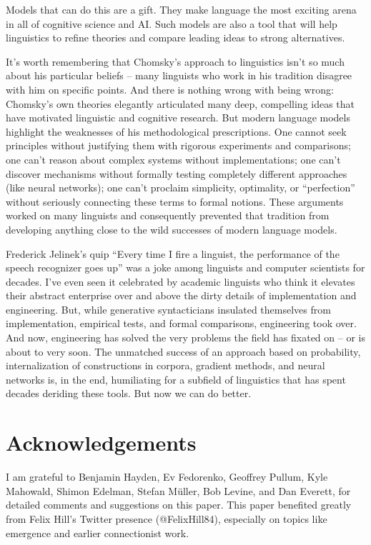 \documentclass[output=paper,colorlinks,citecolor=brown
]{langscibook}
\begin{document}
\noindent Models that can do this are a gift. They make language the most exciting arena in all of cognitive science and AI. Such models are also a tool that will help linguistics to refine theories and compare leading ideas to strong alternatives.

It's worth remembering that Chomsky's approach to linguistics isn't so much about his particular beliefs -- many linguists who work in his tradition disagree with him on specific points. And there is nothing wrong with being wrong: Chomsky's own theories elegantly articulated many deep, compelling ideas that have motivated linguistic and cognitive research. But modern language models highlight the weaknesses of his methodological prescriptions. One cannot seek principles without justifying them with rigorous experiments and comparisons; one can't reason about complex systems without implementations; one can't discover mechanisms without formally testing completely different approaches (like neural networks); one can't proclaim simplicity, optimality, or ``perfection'' without seriously connecting these terms to formal notions. These arguments worked on many linguists and consequently prevented that tradition from developing anything close to the wild successes of modern language models.

Frederick Jelinek's quip ``Every time I fire a linguist, the performance of the speech recognizer goes up'' \citep{jelinek1988applying} was a joke among linguists and computer scientists for decades. I've even seen it celebrated by academic linguists who think it elevates their abstract enterprise over and above the dirty details of implementation and engineering. But, while generative syntacticians insulated themselves from implementation, empirical tests, and formal comparisons, engineering took over. And now, engineering has solved the very problems the field has fixated on -- or is about to very soon. The unmatched success of an approach based on probability, internalization of constructions in corpora, gradient methods, and neural networks is, in the end, humiliating for a subfield of linguistics that has spent decades deriding these tools. But now we can do better. 


\section*{Acknowledgements}

I am grateful to Benjamin Hayden, Ev Fedorenko, Geoffrey Pullum, Kyle Mahowald, Shimon Edelman, Stefan Müller, Bob Levine, and Dan Everett, for detailed comments and suggestions on this paper. This paper benefited greatly from Felix Hill's Twitter presence (@FelixHill84), especially on topics like emergence and earlier connectionist work. 
\end{document}
